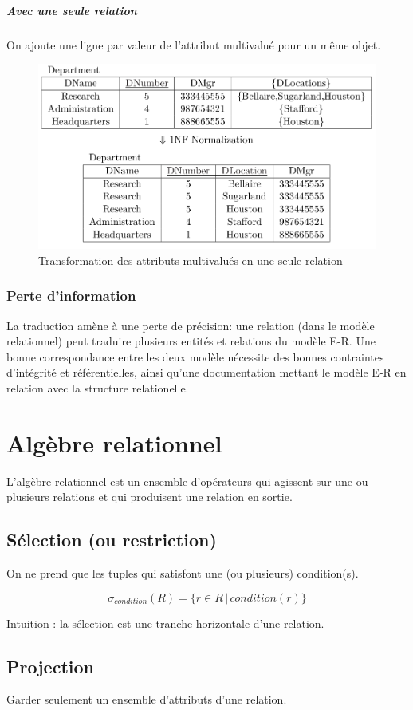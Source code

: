 \documentclass[a4paper]{article}
\begin{document}
\subparagraph{Avec une seule relation}
On ajoute une ligne par valeur de l'attribut multivalué pour un même objet.
\begin{figure}[H]
    \center
    \includegraphics[width=.7\textwidth]{fig/multiattrs-single.png}
    \caption{Transformation des attributs multivalués en une seule relation}
\end{figure}

\subsubsection{Perte d'information}
La traduction amène à une perte de précision: une relation (dans le modèle relationnel)
peut traduire plusieurs entités et relations du modèle E-R. Une bonne correspondance
entre les deux modèle nécessite des bonnes contraintes d'intégrité et référentielles,
ainsi qu'une documentation mettant le modèle E-R en relation avec la structure relationelle.



\section{Algèbre relationnel}

L'algèbre relationnel est un ensemble d'opérateurs qui agissent sur une ou plusieurs
relations et qui produisent une relation en sortie.

  \subsection{Sélection (ou restriction)}
  On ne prend que les tuples qui satisfont une (ou plusieurs) condition(s).

    $$ \sigma_{condition}(R) = \{r\in R\, |\, condition(r)\} $$

  Intuition : la sélection est une tranche horizontale d'une relation. 

  \subsection{Projection}
  Garder seulement un ensemble d'attributs d'une relation.
\end{document}
